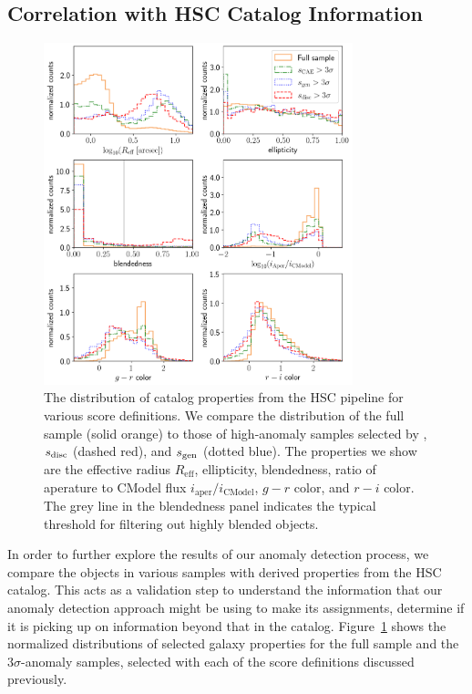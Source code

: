 \subsection{Correlation with HSC Catalog Information}

\begin{figure}
    \centering
    \includegraphics[width=0.8\textwidth]{hsc_histograms_ae.png}  
    \caption{The distribution of catalog properties from the HSC pipeline for various score definitions. We compare the distribution of the full sample (solid orange) to those of high-anomaly samples selected by , $s_\mathrm{disc}$ (dashed red), and $s_\mathrm{gen}$ (dotted blue). The properties we show are the effective radius $R_\mathrm{eff}$, ellipticity, blendedness, ratio of aperature to CModel flux $i_\mathrm{aper}/i_\mathrm{CModel}$, $g-r$ color, and $r-i$ color. The grey line in the blendedness panel indicates the typical threshold for filtering out highly blended objects.}
    \label{fig:hsc_hist}
\end{figure}

In order to further explore the results of our anomaly detection process, we compare the objects in various samples with derived properties from the HSC catalog.
This acts as a validation step to understand the information that our anomaly detection approach might be using to make its assignments,  determine if it is picking up on information beyond that in the catalog.
Figure~\ref{fig:hsc_hist} shows the normalized distributions of selected galaxy properties for the full sample and the $3\sigma$-anomaly samples, selected with each of the score definitions discussed previously.

